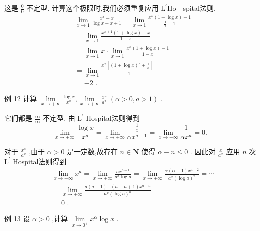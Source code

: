 这是 $\frac{0}{0}$ 不定型. 计算这个极限时,我们必须重复应用 ${\mathrm{L}}^{\prime }\mathrm{{Ho}}$ - spital法则.
\begin{align*}
	&\mathop{\lim }\limits_{{x \rightarrow  1}}\frac{{x}^{x} - x}{\log x - x + 1} = \mathop{\lim }\limits_{{x \rightarrow  1}}\frac{{x}^{x}\left( {1 + \log x}\right)  - 1}{\frac{1}{x} - 1}\\
	&= \mathop{\lim }\limits_{{x \rightarrow  1}}\frac{{x}^{x + 1}\left( {1 + \log x}\right)  - x}{1 - x}\\
	&= \mathop{\lim }\limits_{{x \rightarrow  1}}x \cdot  \mathop{\lim }\limits_{{x \rightarrow  1}}\frac{{x}^{x}\left( {1 + \log x}\right)  - 1}{1 - x}\\
	&= \mathop{\lim }\limits_{{x \rightarrow  1}}\frac{{x}^{x}\left\lbrack  {{\left( 1 + \log x\right) }^{2} + \frac{1}{x}}\right\rbrack  }{-1}\\
	&=  - 2\text{ . }
\end{align*}

例 12 计算 $\mathop{\lim }\limits_{{x \rightarrow   + \infty }}\frac{\log x}{{x}^{a}},\mathop{\lim }\limits_{{x \rightarrow   + \infty }}\frac{{x}^{a}}{{a}^{x}}\;\left( {\alpha  > 0,a > 1}\right)$ .

它们都是 $\frac{\infty }{\infty }$ 不定型. 由 ${\mathrm{L}}^{\prime }$ Hospital法则得到
$$\mathop{\lim }\limits_{{x \rightarrow   + \infty }}\frac{\log x}{{x}^{a}} = \mathop{\lim }\limits_{{x \rightarrow   + \infty }}\frac{\frac{1}{x}}{\alpha {x}^{a - 1}} = \mathop{\lim }\limits_{{x \rightarrow   + \infty }}\frac{1}{\alpha {x}^{a}} = 0.$$

对于 $\frac{{x}^{a}}{{a}^{x}}$ ,由于 $\alpha  > 0$ 是一定数,故存在 $n \in  \mathbf{N}$ 使得 $\alpha  - n \leq  0$ . 因此对 $\frac{x}{{a}^{x}}$ 应用 $n$ 次 ${\mathrm{L}}^{\prime }$ Hospital法则得到
\begin{align*}
	&\mathop{\lim }\limits_{{x \rightarrow   + \infty }}{x}^{a} = \mathop{\lim }\limits_{{x \rightarrow   + \infty }}\frac{a{x}^{a - 1}}{{a}^{x}\log a} = \mathop{\lim }\limits_{{x \rightarrow   + \infty }}\frac{\alpha \left( {\alpha  - 1}\right) {x}^{a - 2}}{{a}^{x}{\left( \log a\right) }^{2}} = \cdots\\
	&= \mathop{\lim }\limits_{{x \rightarrow   + \infty }}\frac{a\left( {a - 1}\right) \cdots \left( {a - n + 1}\right) {x}^{a - n}}{{a}^{x}{\left( \log a\right) }^{n}}\\
	&= 0\text{ . }
\end{align*}

例 13 设 $\alpha  > 0$ ,计算 $\mathop{\lim }\limits_{{x \rightarrow  {0}^{ + }}}{x}^{\alpha }\log x$ .

